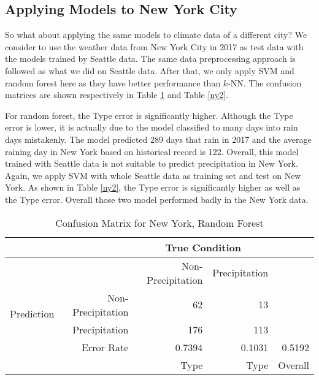 \subsection{Applying Models to New York City}

So what about applying the same models to climate data of a different city? We consider to use the weather data from New York City in 2017 as test data with the models trained by Seattle data. The same data preprocessing approach is followed as what we did on Seattle data. After that, we only apply SVM and random forest here as they have better performance than $k$-NN. The confusion matrices are shown respectively in Table \ref{ny1} and Table \ref{ny2}.

For random forest, the Type \uppercase\expandafter{} error is significantly higher. Although the Type \uppercase\expandafter{} error is lower, it is actually due to the model classified to many days into rain days mistakenly. The model predicted 289 days that rain in 2017 and the average raining day in New York based on historical record is 122. Overall, this model trained with Seattle data is not suitable to predict precipitation in New York. Again, we apply SVM with whole Seattle data as training set and test on New York. As shown in Table \ref{ny2}, the Type \uppercase\expandafter{} error is significantly higher as well as the Type \uppercase\expandafter{} error. Overall those two model performed badly in the New York data.

\begin{table}[h]
\setlength{\belowcaptionskip}{5pt}
\caption{Confusion Matrix for New York, Random Forest}
\label{ny1}
\centering
\renewcommand\arraystretch{1.5}
\begin{tabular}{rrrrr}
\hline
\hline
 & & \multicolumn{2}{c}{True Condition} & \\
\hline
 & & Non-Precipitation & Precipitation & \\
\cline{1-4}
\multirow{2}{*}{Prediction} & {Non-Precipitation} & 62 & 13 & \\
\cline{2-4}
&Precipitation&176&113&\\
\hline
&Error Rate & 0.7394 & 0.1031 & 0.5192\\
\cline{2-5}
& & Type \uppercase\expandafter{\romannumeral1} & Type \uppercase\expandafter{\romannumeral2} & Overall\\
\hline
\end{tabular}
\end{table}

